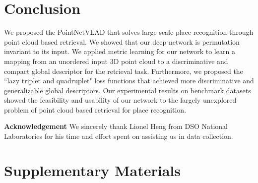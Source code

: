 \documentclass[10pt,twocolumn,letterpaper]{article}
\begin{document}
%
 	\vspace{-0.6cm}
\section{Conclusion}
\vspace{-0.2cm}
We proposed the PointNetVLAD that solves large scale place recognition through point cloud based retrieval. 
We showed that our deep network is permutation invariant to its input. We applied metric learning for our network to learn a mapping from an unordered input 3D point cloud to a discriminative and compact global descriptor for the retrieval task. 
Furthermore, we proposed the ``lazy triplet and quadruplet" loss functions that achieved more discriminative and generalizable global descriptors. Our experimental results on benchmark datasets showed the feasibility and usability of our network to the largely unexplored problem of point cloud based retrieval for place recognition.\newline

\noindent\textbf{Acknowledgement} We sincerely thank Lionel Heng from DSO National Laboratories for his time and effort spent on assisting us in data collection. 	
	{\small
		
		
	}

	\vspace{+4cm}
	\appendix
	\noindent \section*{Supplementary Materials}
\end{document}
